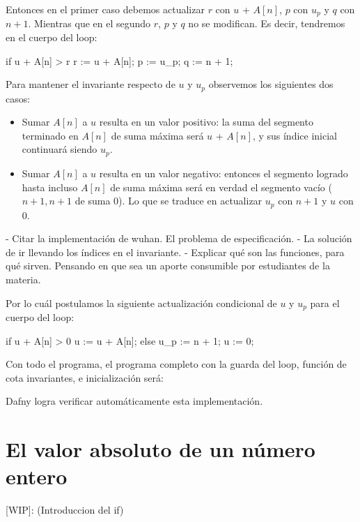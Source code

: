 \documentclass[12pt, a4paper, openany, fleqn]{book}
\begin{document}
    Entonces en el primer caso debemos actualizar $r$ con $u$ + $A[n]$, $p$ con $u_p$ y $q$ con $n+1$. Mientras que en el segundo $r$, $p$ y $q$ no se modifican. Es decir, tendremos en el cuerpo del loop:
    \begin{dafny}
        if u + A[n] > r {
            r := u + A[n];
            p := u_p;
            q := n + 1;
        }
    \end{dafny}

    Para mantener el invariante respecto de $u$ y $u_p$ observemos los siguientes dos casos:
    \begin{itemize}
        \item Sumar $A[n]$ a $u$ resulta en un valor positivo: la suma del segmento terminado en $A[n]$ de suma máxima será $u$ + $A[n]$, y sus índice inicial continuará siendo $u_p$.
        \item Sumar $A[n]$ a $u$ resulta en un valor negativo: entonces el segmento logrado hasta incluso $A[n]$ de suma máxima será en verdad el segmento vacío ($n+1,n+1$ de suma $0$). Lo que se traduce en actualizar $u_p$ con $n+1$ y $u$ con 0.
    \end{itemize}

    - Citar la implementación de wuhan. El problema de especificación.
    - La solución de ir llevando los índices en el invariante.
    - Explicar qué son las funciones, para qué sirven. Pensando en que sea un aporte consumible por estudiantes de la materia.

    Por lo cuál postulamos la siguiente actualización condicional de $u$ y $u_p$ para el cuerpo del loop:
    \begin{dafny}
        if u + A[n] > 0 {
            u := u + A[n];
        } else {
            u_p := n + 1;
            u := 0;
        }
    \end{dafny}

    Con todo el programa, el programa completo con la guarda del loop, función de cota invariantes, e inicialización será:


    Dafny logra verificar automáticamente esta implementación.

    \section{El valor absoluto de un número entero}
    [WIP]: (Introduccion del if)
\end{document}
